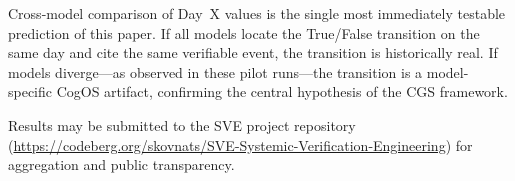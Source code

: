 \documentclass[11pt,a4paper]{article}
\theoremstyle{definition}
\theoremstyle{plain}
\theoremstyle{remark}
\begin{document}
Cross-model comparison of Day~X values is the single most immediately
testable prediction of this paper.
If all models locate the True/False transition on the same day and
cite the same verifiable event, the transition is historically real.
If models diverge---as observed in these pilot runs---the transition
is a model-specific CogOS artifact, confirming the central hypothesis
of the CGS framework.

Results may be submitted to the SVE project repository
(\url{https://codeberg.org/skovnats/SVE-Systemic-Verification-Engineering})
for aggregation and public transparency.
\end{document}
